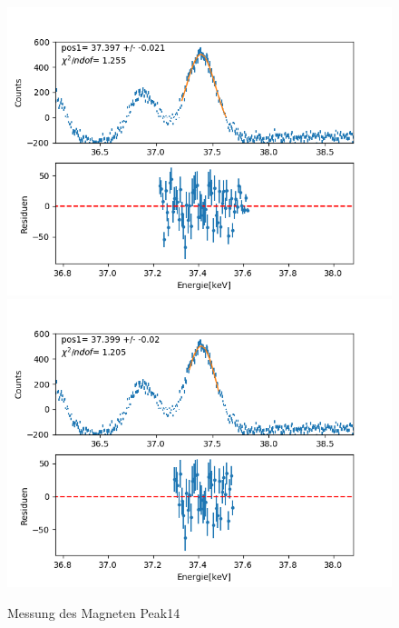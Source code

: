 \documentclass[12pt,a4paper]{article}
\begin{document}
\begin{figure}[H]
\centering
\includegraphics[scale=0.49]{Bilder/roentgen_spektren/magnet/mag14_1.png}
\includegraphics[scale=0.49]{Bilder/roentgen_spektren/magnet/mag14_2.png}
\caption{Messung des Magneten Peak14}
\end{figure}
\end{document}
